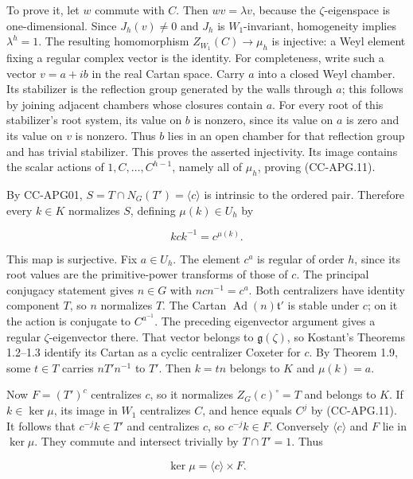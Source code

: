 To prove it, let \(w\) commute with \(C\). Then \(wv=\lambda v\),
because the \(\zeta\)-eigenspace is one-dimensional. Since
\(J_h(v)\ne0\) and \(J_h\) is \(W_1\)-invariant, homogeneity implies
\(\lambda^h=1\). The resulting homomorphism \(Z_{W_1}(C)\to\mu_h\) is
injective: a Weyl element fixing a regular complex vector is the
identity. For completeness, write such a vector \(v=a+ib\) in the real
Cartan space. Carry \(a\) into a closed Weyl chamber. Its stabilizer is
the reflection group generated by the walls through \(a\); this follows
by joining adjacent chambers whose closures contain \(a\). For every
root of this stabilizer's root system, its value on \(b\) is nonzero,
since its value on \(a\) is zero and its value on \(v\) is nonzero. Thus
\(b\) lies in an open chamber for that reflection group and has trivial
stabilizer. This proves the asserted injectivity. Its image contains the
scalar actions of \(1,C,\ldots,C^{h-1}\), namely all of \(\mu_h\),
proving (CC-APG.11).

By CC-APG01, \(S=T\cap N_G(T')=\langle c\rangle\) is intrinsic to the
ordered pair. Therefore every \(k\in K\) normalizes \(S\), defining
\(\mu(k)\in U_h\) by

\[
 kck^{-1}=c^{\mu(k)}.
\]

This map is surjective. Fix \(a\in U_h\). The element \(c^a\) is regular
of order \(h\), since its root values are the primitive-power transforms
of those of \(c\). The principal conjugacy statement gives \(n\in G\)
with \(ncn^{-1}=c^a\). Both centralizers have identity component \(T\),
so \(n\) normalizes \(T\). The Cartan
\(\operatorname{Ad}(n)\mathfrak t'\) is stable under \(c\); on it the
action is conjugate to \(C^{a^{-1}}\). The preceding eigenvector
argument gives a regular \(\zeta\)-eigenvector there. That vector
belongs to \(\mathfrak g(\zeta)\), so Kostant's Theorems 1.2--1.3
identify its Cartan as a cyclic centralizer Coxeter for \(c\). By
Theorem 1.9, some \(t\in T\) carries \(nT'n^{-1}\) to \(T'\). Then
\(k=tn\) belongs to \(K\) and \(\mu(k)=a\).

Now \(F=(T')^c\) centralizes \(c\), so it normalizes \(Z_G(c)^\circ=T\)
and belongs to \(K\). If \(k\in\ker\mu\), its image in \(W_1\)
centralizes \(C\), and hence equals \(C^j\) by (CC-APG.11). It follows
that \(c^{-j}k\in T'\) and centralizes \(c\), so \(c^{-j}k\in F\).
Conversely \(\langle c\rangle\) and \(F\) lie in \(\ker\mu\). They
commute and intersect trivially by \(T\cap T'=1\). Thus

\[
 \ker\mu=\langle c\rangle\times F.
 \tag{CC-APG.12}
\]

